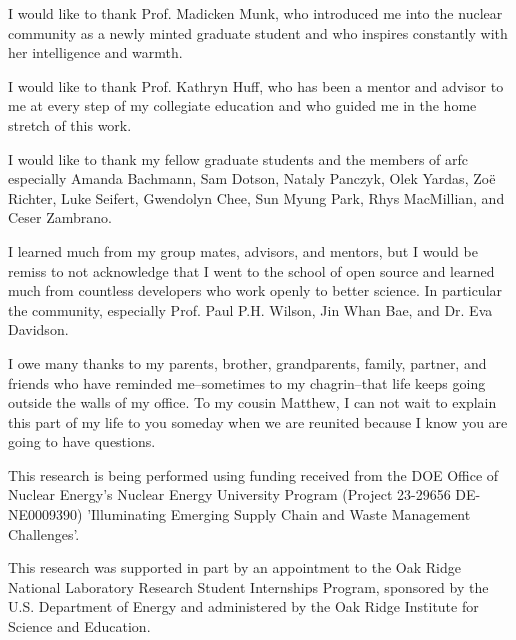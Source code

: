 I would like to thank Prof. Madicken Munk, who introduced me into
the nuclear community as a newly minted graduate student and who inspires
constantly with her intelligence and warmth.

I would like to thank Prof. Kathryn Huff, who has been a mentor and advisor to
me at every step of my collegiate education and who guided me in the home stretch of this work.

I would like to thank my fellow graduate students and the members of
\gls{arfc} especially Amanda Bachmann, Sam Dotson, Nataly Panczyk, Olek Yardas,
Zo\"{e} Richter, Luke Seifert, Gwendolyn Chee, Sun Myung Park, Rhys MacMillian, and Ceser Zambrano.

I learned much from my group mates, advisors, and mentors, but I would be
remiss to not acknowledge that I went to the school of open source and
learned much from countless developers who work openly to better science. In
particular the \cyclus community, especially Prof. Paul P.H. Wilson, Jin Whan
Bae, and Dr. Eva Davidson.

I owe many thanks to my parents, brother, grandparents, family, partner, and
friends who have reminded me--sometimes to my chagrin--that life keeps going
outside the walls of my office. To my cousin Matthew, I can not wait to explain
this part of my life to you someday when we are reunited because I know you are
going to have questions.

This research is being performed using funding received from the DOE Office of
Nuclear Energy's Nuclear Energy University Program (Project 23-29656
DE-NE0009390) 'Illuminating Emerging Supply Chain and Waste Management
Challenges'.

This research was supported in part by an appointment to the Oak Ridge National
Laboratory Research Student Internships Program, sponsored by the U.S.
Department of Energy and administered by the Oak Ridge Institute for Science
and Education.